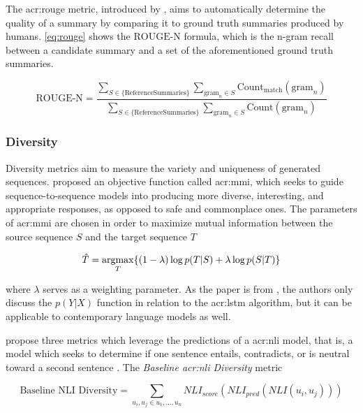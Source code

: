 The \gls{acr:rouge} metric, introduced by \cite{linROUGEPackageAutomatic2004}, aims to automatically determine the quality of a summary by comparing it to ground truth summaries produced by humans. \eqref{eq:rouge} shows the $\text{ROUGE-N}$ formula, which is the n-gram recall between a candidate summary and a set of the aforementioned ground truth summaries.

\begin{equation}
    \text{ROUGE-N} = \frac{
    \sum_{S \in \{\text{ReferenceSummaries}\}}
    \sum_{\text{gram}_n \in S}
    \text{Count}_{\text{match}}(\text{gram}_n)
    }{
    \sum_{S \in \{\text{ReferenceSummaries}\}}
    \sum_{\text{gram}_n \in S}
    \text{Count}(\text{gram}_n)
    }
    \label{eq:rouge}
\end{equation}

\subsubsection{Diversity}

Diversity metrics aim to measure the variety and uniqueness of generated sequences. \cite{liDiversityPromotingObjectiveFunction2016} proposed an objective function called \gls{acr:mmi}, which seeks to guide sequence-to-sequence models into producing more diverse, interesting, and appropriate responses, as opposed to safe and commonplace ones. The parameters of \gls{acr:mmi} are chosen in order to maximize mutual information between the source sequence $S$ and the target sequence $T$

\begin{equation}
    \hat{T} = \operatorname*{argmax}_{T} \{ (1 - \lambda) \log p(T|S) + \lambda \log p(S|T) \}
\end{equation}

\noindent where $\lambda$ serves as a weighting parameter. As the paper is from \citeyear{liDiversityPromotingObjectiveFunction2016}, the authors only discuss the $p(Y|X)$ function in relation to the \gls{acr:lstm} algorithm, but it can be applicable to contemporary language models as well.

\cite{stasaskiSemanticDiversityDialogue2022} propose three metrics which leverage the predictions of a \gls{acr:nli} model, that is, a model which seeks to determine if one sentence entails, contradicts, or is neutral toward a second  sentence \citep[1]{stasaskiSemanticDiversityDialogue2022}. The \textit{Baseline \acrshort{acr:nli} Diversity} metric

\begin{equation}
    \text{Baseline NLI Diversity} = \sum_{u_i,u_j \in u_1,...,u_n} NLI_{score}(NLI_{pred}(NLI(u_i, u_j)))
\end{equation}

